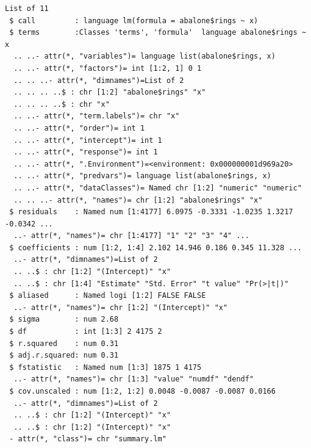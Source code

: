 \documentclass[
  11pt,
]{krantz}
\newenvironment{Shaded}{\begin{snugshade}}{\end{snugshade}}
\newcommand{\CommentTok}[1]{\textcolor[rgb]{0.37,0.37,0.37}{\textit{#1}}}
\newcommand{\ControlFlowTok}[1]{\textcolor[rgb]{0.27,0.27,0.27}{\textbf{#1}}}
\newcommand{\DecValTok}[1]{\textcolor[rgb]{0.06,0.06,0.06}{#1}}
\newcommand{\KeywordTok}[1]{\textcolor[rgb]{0.27,0.27,0.27}{\textbf{#1}}}
\newcommand{\NormalTok}[1]{#1}
\newcommand{\OperatorTok}[1]{\textcolor[rgb]{0.43,0.43,0.43}{\textbf{#1}}}
\newcommand{\StringTok}[1]{\textcolor[rgb]{0.5,0.5,0.5}{#1}}
\begin{document}
\footnotesize

\begin{Shaded}
\end{Shaded}

\begin{verbatim}
List of 11
 $ call         : language lm(formula = abalone$rings ~ x)
 $ terms        :Classes 'terms', 'formula'  language abalone$rings ~ x
  .. ..- attr(*, "variables")= language list(abalone$rings, x)
  .. ..- attr(*, "factors")= int [1:2, 1] 0 1
  .. .. ..- attr(*, "dimnames")=List of 2
  .. .. .. ..$ : chr [1:2] "abalone$rings" "x"
  .. .. .. ..$ : chr "x"
  .. ..- attr(*, "term.labels")= chr "x"
  .. ..- attr(*, "order")= int 1
  .. ..- attr(*, "intercept")= int 1
  .. ..- attr(*, "response")= int 1
  .. ..- attr(*, ".Environment")=<environment: 0x000000001d969a20> 
  .. ..- attr(*, "predvars")= language list(abalone$rings, x)
  .. ..- attr(*, "dataClasses")= Named chr [1:2] "numeric" "numeric"
  .. .. ..- attr(*, "names")= chr [1:2] "abalone$rings" "x"
 $ residuals    : Named num [1:4177] 6.0975 -0.3331 -1.0235 1.3217 -0.0342 ...
  ..- attr(*, "names")= chr [1:4177] "1" "2" "3" "4" ...
 $ coefficients : num [1:2, 1:4] 2.102 14.946 0.186 0.345 11.328 ...
  ..- attr(*, "dimnames")=List of 2
  .. ..$ : chr [1:2] "(Intercept)" "x"
  .. ..$ : chr [1:4] "Estimate" "Std. Error" "t value" "Pr(>|t|)"
 $ aliased      : Named logi [1:2] FALSE FALSE
  ..- attr(*, "names")= chr [1:2] "(Intercept)" "x"
 $ sigma        : num 2.68
 $ df           : int [1:3] 2 4175 2
 $ r.squared    : num 0.31
 $ adj.r.squared: num 0.31
 $ fstatistic   : Named num [1:3] 1875 1 4175
  ..- attr(*, "names")= chr [1:3] "value" "numdf" "dendf"
 $ cov.unscaled : num [1:2, 1:2] 0.0048 -0.0087 -0.0087 0.0166
  ..- attr(*, "dimnames")=List of 2
  .. ..$ : chr [1:2] "(Intercept)" "x"
  .. ..$ : chr [1:2] "(Intercept)" "x"
 - attr(*, "class")= chr "summary.lm"
\end{verbatim}
\end{document}
